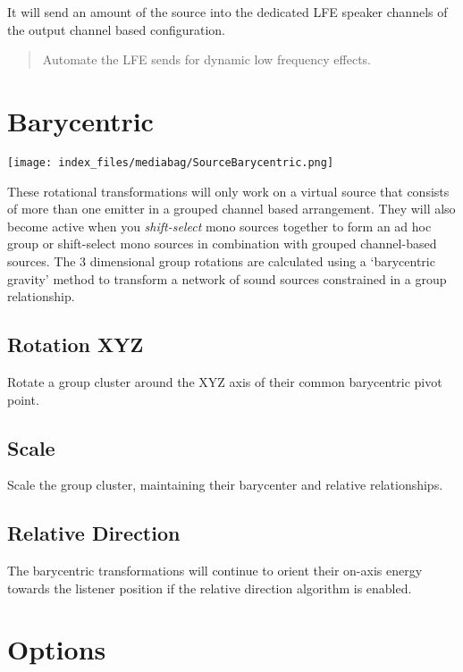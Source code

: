 \documentclass[
  letterpaper,
  DIV=11,
  numbers=noendperiod]{scrreport}
\begin{document}
It will send an amount of the source into the dedicated LFE speaker
channels of the output channel based configuration.

\begin{quote}
Automate the LFE sends for dynamic low frequency effects.
\end{quote}

\hypertarget{barycentric}{%
\section{Barycentric}\label{barycentric}}

\texttt{[image: index\_files/mediabag/SourceBarycentric.png]}

These rotational transformations will only work on a virtual source that
consists of more than one emitter in a grouped channel based
arrangement. They will also become active when you \emph{shift-select}
mono sources together to form an ad hoc group or shift-select mono
sources in combination with grouped channel-based sources. The 3
dimensional group rotations are calculated using a `barycentric gravity'
method to transform a network of sound sources constrained in a group
relationship.

\hypertarget{rotation-xyz}{%
\subsection{Rotation XYZ}\label{rotation-xyz}}

Rotate a group cluster around the XYZ axis of their common barycentric
pivot point.

\hypertarget{scale}{%
\subsection{Scale}\label{scale}}

Scale the group cluster, maintaining their barycenter and relative
relationships.

\hypertarget{relative-direction-1}{%
\subsection{Relative Direction}\label{relative-direction-1}}

The barycentric transformations will continue to orient their on-axis
energy towards the listener position if the relative direction algorithm
is enabled.

\hypertarget{options}{%
\section{Options}\label{options}}
\end{document}
